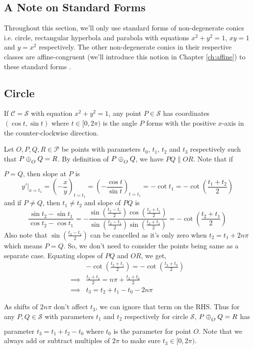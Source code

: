 \subsection*{A Note on Standard Forms}

Throughout this section, we'll only use standard forms of non-degenerate conics
i.e. circle, rectangular hyperbola and parabola with equations $x^2+y^2=1$, $xy=1$
and $y=x^2$ respectively. The other non-degenerate conics in their respective
classes are affine-congruent (we'll introduce this notion in Chapter
\ref{ch:affine}) to these standard forms \cite[\S~2.5 Thm.~4]{brannan}.

\subsection*{Circle}

If $\mathcal{C}=\mathcal{S}$ with equation $x^2+y^2=1$, any point
$P\in\mathcal{S}$ has coordinates $(\cos t,\sin t)$ where $t\in[0,2\pi)$ is the
angle $P$ forms with the positive $x$-axis in the counter-clockwise direction.
\vspace{1ex}

Let $O,P,Q,R\in\mathcal{P}$ be points with parameters $t_0$, $t_1$, $t_2$ and
$t_3$ respectively such that $P \conop Q = R$. By definition of $P \conop Q$, we
have $PQ \parallel OR$. Note that if $P=Q$, then slope at $P$ is
\[
    y'|_{x=t_1} = \left(-\frac{x}{y}\right)_{t=t_1}
    = \left(-\frac{\cos t}{\sin t}\right)_{t=t_1}
                = -\cot t_1
                = -\cot \left(\frac{t_1+t_2}{2}\right)
\]
and if $P \neq Q$, then $t_1 \neq t_2$ and slope of $PQ$ is 
\[
    \frac{\sin t_2 - \sin t_1}{\cos t_2 - \cos t_1}
    = -\frac{\sin\left(\frac{t_2-t_1}{2}\right)\cos\left(\frac{t_2+t_1}{2}\right)}{\sin\left(\frac{t_2-t_1}{2}\right)\sin\left(\frac{t_2+t_1}{2}\right)}
    = -\cot\left(\frac{t_2+t_1}{2}\right)
\]
Also note that $\sin\left(\frac{t_2 - t_1}{2}\right)$ can be cancelled as it's
only zero when $t_2=t_1+2n\pi$ which means $P=Q$. So, we don't need to consider
the points being same as a separate case. Equating slopes of $PQ$ and $OR$, we
get,
\begin{align*}
    &-\cot\left(\frac{t_2+t_1}{2}\right) = -\cot\left(\frac{t_3+t_0}{2}\right) \\
    \implies& \frac{t_2+t_1}{2} = n\pi+\frac{t_3+t_0}{2} \\
    \implies& t_3 = t_2 + t_1 - t_0 - 2n\pi
\end{align*}

\noindent
As shifts of $2n\pi$ don't affect $t_3$, we can ignore that term on the RHS.
Thus for any $P,Q\in\mathcal{S}$ with parameters $t_1$ and $t_2$
respectively for circle $\mathcal{S}$, $P \conop Q = R$ has parameter
$t_3 = t_1 + t_2 - t_0$ where $t_0$ is the parameter for point
$O$. Note that we always add or subtract multiples of $2\pi$ to make sure
$t_3\in[0,2\pi)$.
\vspace{1ex}

